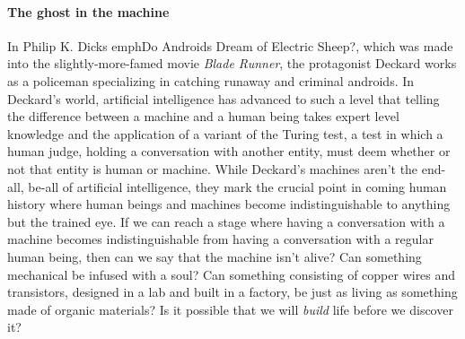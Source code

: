 
\paragraph{The ghost in the machine}

In Philip K. Dicks emph{Do Androids Dream of Electric Sheep?}, which was made into the slightly-more-famed movie \emph{Blade Runner}, the protagonist Deckard works as a policeman specializing in catching runaway and criminal androids. In Deckard's world, artificial intelligence has advanced to such a level that telling the difference between a machine and a human being takes expert level knowledge and the application of a variant of the Turing test, a test in which a human judge, holding a conversation with another entity, must deem whether or not that entity is human or machine. 
While Deckard's machines aren't the end-all, be-all of artificial intelligence, they mark the crucial point in coming human history where human beings and machines become indistinguishable to anything but the trained eye. If we can reach a stage where having a conversation with a machine becomes indistinguishable from having a conversation with a regular human being, then can we say that the machine isn't alive? Can something mechanical be infused with a soul? Can something consisting of copper wires and transistors, designed in a lab and built in a factory, be just as living as something made of organic materials? Is it possible that we will \emph{build} life before we discover it?

